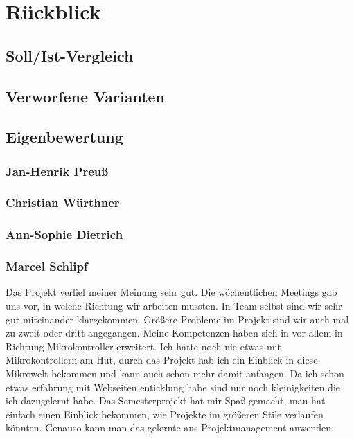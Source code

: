 \chapter{Rückblick}

\section{Soll/Ist-Vergleich}

\section{Verworfene Varianten}

\section{Eigenbewertung}

\subsection*{Jan-Henrik Preuß}

\subsection*{Christian Würthner}

\subsection*{Ann-Sophie Dietrich}

\subsection*{Marcel Schlipf}
Das Projekt verlief meiner Meinung sehr gut. Die wöchentlichen Meetings gab uns
vor, in welche Richtung wir arbeiten mussten. In Team selbst sind wir sehr gut
miteinander klargekommen. Größere Probleme im Projekt sind wir auch mal zu zweit
oder dritt angegangen. \newline
Meine Kompetenzen haben sich in vor allem in Richtung Mikrokontroller erweitert.
Ich hatte noch nie etwas mit Mikrokontrollern am Hut, durch das Projekt hab ich
ein Einblick in diese Mikrowelt bekommen und kann auch schon mehr damit
anfangen.\newline
Da ich schon etwas erfahrung mit Webseiten enticklung habe sind nur noch
kleinigkeiten die ich dazugelernt habe.\newline
Das Semesterprojekt hat mir Spaß gemacht, man hat einfach einen Einblick
bekommen, wie Projekte im größeren Stile verlaufen könnten. Genauso kann man das
gelernte aus Projektmanagement anwenden.
